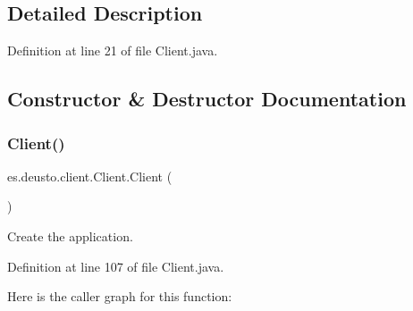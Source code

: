 \subsection{Detailed Description}


Definition at line 21 of file Client.\+java.



\subsection{Constructor \& Destructor Documentation}
\mbox{\label{classes_1_1deusto_1_1client_1_1_client_a71c03e318a72447da873297f3364f67f}} 
\subsubsection{\texorpdfstring{Client()}{Client()}}
{\footnotesize\ttfamily es.\+deusto.\+client.\+Client.\+Client (\begin{DoxyParamCaption}{ }\end{DoxyParamCaption})}

Create the application. 

Definition at line 107 of file Client.\+java.

Here is the caller graph for this function\+:
